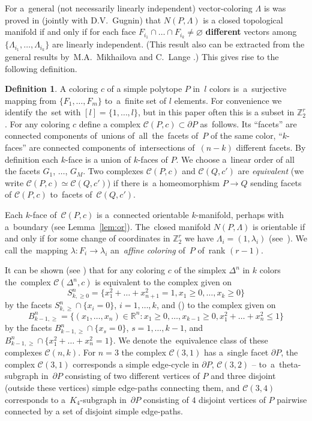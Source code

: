 \documentclass[12pt]{amsart}
\theoremstyle{definition}
\newtheorem{definition}[formula]{Definition}
\theoremstyle{remark}
\begin{document}
For a~general (not necessarily linearly independent) vector-coloring $\Lambda$
is was proved in \cite[Theorem 5.1]{E24} (jointly with D.V.~Gugnin) that $N(P,\Lambda)$ is a closed
topological manifold if and only if for each face $F_{i_1}\cap \dots\cap F_{i_k}\ne\varnothing$ {\bf different}
vectors among $\{\Lambda_{i_1}, \dots, \Lambda_{i_k}\}$ are linearly independent.
(This result also can be extracted from the general results 
 by~M.A.~Mikhailova and C.~Lange \cite{M85,LM16,L19}.) This gives rise to the following definition. 
\begin{definition}\cite[Definition 2.1]{E24}
A coloring $c$ of a simple polytope $P$ in~$l$ colors is~a~surjective mapping from 
$\{F_1,\dots, F_m\}$ to~a~finite set of $l$ elements. For convenience we identify the~set with 
$[l]=\{1,\dots, l\}$, but in this paper often this is a subset in $\mathbb Z_2^r$. 
For any coloring $c$ define a complex $\mathcal{C}(P,c)\subset \partial P$ as~follows. 
Its ``facets'' are connected components of~unions of~all~the~facets of~$P$ of the same color, 
``$k$-faces'' are connected components of~intersections of~$(n-k)$ different facets. By definition each $k$-face
is a union of $k$-faces of $P$. We choose a~linear order of all the facets $G_1$, $\dots$, $G_M$. Two 
complexes $\mathcal{C}(P,c)$ and $\mathcal{C}(Q,c')$ are  {\it equivalent} (we write $\mathcal{C}(P,c)\simeq \mathcal{C}(Q,c')$) 
if there is~a homeomorphism $P\to Q$ sending facets of $\mathcal{C}(P,c)$ to~facets of~$\mathcal{C}(Q,c')$. 
\end{definition}
Each $k$-face of~$\mathcal{C}(P,c)$ is a~connected orientable $k$-manifold, perhaps with a~boundary
(see Lemma~\ref{lem:or}). The~closed manifold $N(P,\Lambda)$ is orientable 
if and only if for some change of coordinates in $\mathbb Z_2^r$ we have $\Lambda_i=(1,\lambda_i)$ 
(see~\cite[Corollary 1.15]{E24}). We call the~mapping $\lambda\colon F_i\to \lambda_i$ an~{\it affine coloring} of~$P$ 
of~rank $(r-1)$. 



It can be shown (see \cite[Proposition 2.6]{E24}) that for any coloring $c$ of the simplex  $\Delta^n$ in $k$ colors
the~complex $\mathcal{C}(\Delta^n,c)$ is equivalent to the complex given on 
$$
S^n_{k,\geqslant 0}=\{x_1^2+\dots+x_{n+1}^2=1, x_1\geqslant 0,\dots, x_k\geqslant 0\}
$$ 
by the facets $S^n_{k,\geqslant}\cap \{x_i=0\}$, $i=1,\dots, k$, and (\cite[Corollary 2.11]{E24}) to the complex given on 
$$
B^n_{k-1,\geqslant}=\{(x_1,\dots,x_n)\in\mathbb R^n\colon x_1\geqslant 0,\dots, x_{k-1}\geqslant 0, x_1^2+\dots+x_n^2\leqslant 1\}
$$
by the facets  $B^n_{k-1,\geqslant}\cap\{x_s=0\}$, $s=1,\dots, k-1$, and  $B^n_{k-1,\geqslant}\cap\{x_1^2+\dots+x_n^2=1\}$.
We denote the~equivalence class of these complexes $\mathcal{C}(n,k)$.
For $n=3$ the complex $\mathcal{C}(3,1)$ has a~single facet $\partial P$, the complex 
$\mathcal{C}(3,1)$ corresponds a simple edge-cycle in $\partial P$, $\mathcal{C}(3,2)$ -- to~a~theta-subgraph in~$\partial P$
consisting of two different vertices of $P$ and three disjoint (outside these vertices) simple edge-paths connecting them,
and $\mathcal{C}(3,4)$ corresponds to a~$K_4$-subgraph in~$\partial P$ consisting of $4$ disjoint vertices of $P$ 
pairwise connected by a set of disjoint simple edge-paths. 
\end{document}
